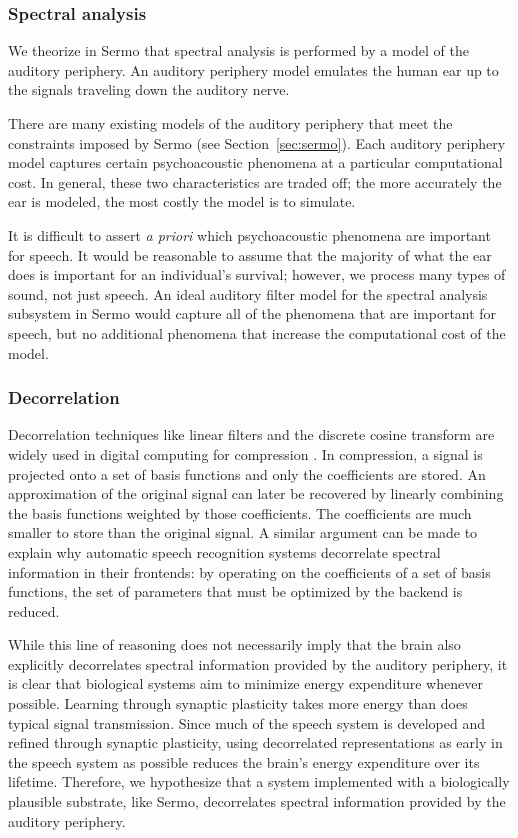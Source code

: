 \subsubsection{Spectral analysis}

We theorize in Sermo that spectral analysis
is performed by a model
of the auditory periphery.
An auditory periphery model
emulates the human ear
up to the signals
traveling down the auditory nerve.

There are many existing
models of the auditory periphery
that meet the constraints
imposed by Sermo (see Section~\ref{sec:sermo}).
Each auditory periphery model
captures certain psychoacoustic phenomena
at a particular computational cost.
In general, these two characteristics
are traded off;
the more accurately the ear is modeled,
the most costly the model is to simulate.

It is difficult to assert \textit{a priori}
which psychoacoustic phenomena
are important for speech.
It would be reasonable to assume that
the majority of what the ear does
is important for an individual's survival;
however, we process many types of sound,
not just speech.
An ideal auditory filter model
for the spectral analysis subsystem
in Sermo
would capture all of the phenomena
that are important for speech,
but no additional phenomena
that increase the computational cost
of the model.

\subsubsection{Decorrelation}

Decorrelation techniques like
linear filters and the discrete cosine transform
are widely used in digital computing
for compression \citep{khayam2003}.
In compression, a signal is projected
onto a set of basis functions
and only the coefficients are stored.
An approximation of the original signal
can later be recovered by linearly combining
the basis functions weighted by those coefficients.
The coefficients are much smaller
to store than the original signal.
A similar argument can be made
to explain why automatic speech recognition systems
decorrelate spectral information in their frontends:
by operating on the coefficients of a set
of basis functions,
the set of parameters that must be optimized
by the backend is reduced.

While this line of reasoning
does not necessarily imply that
the brain also explicitly decorrelates
spectral information
provided by the auditory periphery,
it is clear that biological systems
aim to minimize energy expenditure whenever possible.
Learning through synaptic plasticity
takes more energy than does
typical signal transmission.
Since much of the speech system
is developed and refined
through synaptic plasticity,
using decorrelated representations
as early in the speech system as possible
reduces the brain's energy expenditure
over its lifetime.
Therefore, we hypothesize
that a system implemented
with a biologically plausible substrate,
like Sermo,
decorrelates spectral information
provided by the auditory periphery.

